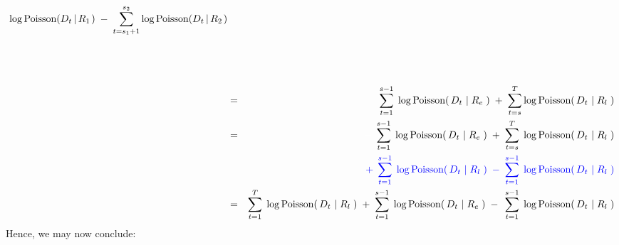 \begin{eqnarray*}
	\log \textnormal{Poisson}\!\left(D_{t} \left\vert\,R_{1}\right.\right)
	\; - \;
	\overset{s_{2}}{\underset{t=s_{1}+1}{\sum}}
	\log \textnormal{Poisson}\!\left(D_{t} \left\vert\,R_{2}\right.\right)
\\
\\
\\
\\
&=&
	\overset{s-1}{\underset{t=1}{\sum}}\;
	\log\textnormal{Poisson}\!\left(\,D_{t} \,\left\vert\; R_{e}\right.\,\right)
	\; + \;
	\overset{T}{\underset{t=s}{\sum}}
	\log\textnormal{Poisson}\!\left(\,D_{t} \,\left\vert\; R_{l}\right.\,\right)
\\
&=&
	{\color{white}+}\;\,
	\overset{s-1}{\underset{t=1}{\sum}}\;
	\log\textnormal{Poisson}\!\left(\,D_{t} \,\left\vert\; R_{e}\right.\,\right)
	\; + \;
	\overset{T}{\underset{t=s}{\sum}}\;
	\log\textnormal{Poisson}\!\left(\,D_{t} \,\left\vert\; R_{l}\right.\,\right)
\\
&&
	{\color{blue}
	+\;\,
	\overset{s-1}{\underset{t=1}{\sum}}\;
	\log\textnormal{Poisson}\!\left(\,D_{t} \,\left\vert\; R_{l}\right.\,\right)
	\; - \;
	\overset{s-1}{\underset{t=1}{\sum}}\;
	\log\textnormal{Poisson}\!\left(\,D_{t} \,\left\vert\; R_{l}\right.\,\right)
	}
\\
&=&
	\overset{T}{\underset{t=1}{\sum}}\;
	\log\textnormal{Poisson}\!\left(\,D_{t} \,\left\vert\; R_{l}\right.\,\right)
	\;+\;
	\overset{s-1}{\underset{t=1}{\sum}}\;
	\log\textnormal{Poisson}\!\left(\,D_{t} \,\left\vert\; R_{e}\right.\,\right)
		\;-\;\,
		\overset{s-1}{\underset{t=1}{\sum}}\;
		\log\textnormal{Poisson}\!\left(\,D_{t} \,\left\vert\; R_{l}\right.\,\right)
\end{eqnarray*}
Hence, we may now conclude:
